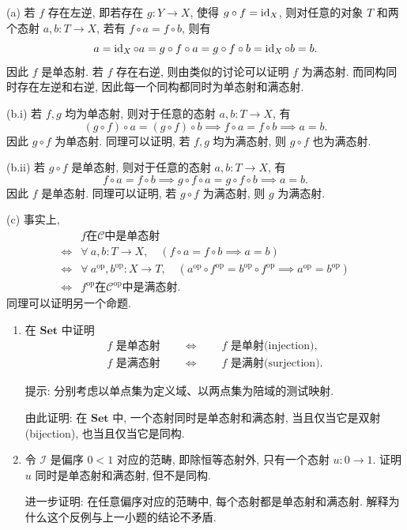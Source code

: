 \documentclass{article}
\newcommand{\op}{^{\mathrm{op}}}
\begin{document}
\begin{solution}
	(a) 若 $f$ 存在左逆, 即若存在 $g: Y \to X$, 使得 $g\circ f = \operatorname{id}_X$, 则对任意的对象 $T$ 和两个态射 $a,b: T\to X$, 若有 $f \circ a = f \circ b$, 则有
	\[ a = \operatorname{id}_X \circ a = g \circ f \circ a = g \circ f \circ b = \operatorname{id}_X \circ b = b. \]
	因此 $f$ 是单态射. 若 $f$ 存在右逆, 则由类似的讨论可以证明 $f$ 为满态射. 而同构同时存在左逆和右逆, 因此每一个同构都同时为单态射和满态射.

	(b.i) 若 $f,g$ 均为单态射, 则对于任意的态射 $a,b:T\to X$, 有
	\[ (g\circ f)\circ a = (g\circ f)\circ b \implies f \circ a = f\circ b \implies a=b. \]
	因此 $g\circ f$ 为单态射. 同理可以证明, 若 $f,g$ 均为满态射, 则 $g\circ f$ 也为满态射.

	(b.ii) 若 $g\circ f$ 是单态射, 则对于任意的态射 $a,b:T\to X$, 有
	\[ f \circ a = f \circ b \implies g \circ f \circ a = g \circ f \circ b \implies a = b. \]
	因此 $f$ 是单态射. 同理可以证明, 若 $g\circ f$ 为满态射, 则 $g$ 为满态射.

	(c) 事实上, 
	\[ \begin{array}{cc}
		& f \text{在} \mathcal{C} \text{中是单态射} \\
		\Longleftrightarrow & \forall\ a,b:T \to X, \quad (f \circ a = f \circ b \implies a=b) \\
		\Longleftrightarrow & \forall\ a\op, b\op: X\to T, \quad (a\op \circ f\op = b\op \circ f\op \implies a\op = b\op) \\
		\Longleftrightarrow & f\op \text{在} \mathcal{C}\op \text{中是满态射}.
	\end{array} \]
	同理可以证明另一个命题.
\end{solution}



\begin{problem}
  \begin{enumerate}
    \item[(a)] 在 $\mathbf{Set}$ 中证明
			\begin{gather*}
        f\text{ 是单态射}\qquad\Longleftrightarrow\qquad f\text{ 是单射(injection)},\\
        f\text{ 是满态射}\qquad\Longleftrightarrow\qquad f\text{ 是满射(surjection)}.
			\end{gather*}

      提示: 分别考虑以单点集为定义域、以两点集为陪域的测试映射.

      由此证明: 在 $\mathbf{Set}$ 中, 一个态射同时是单态射和满态射, 当且仅当它是双射(bijection), 也当且仅当它是同构.

    \item[(b)] 令 $\mathcal I$ 是偏序 $0<1$ 对应的范畴, 即除恒等态射外, 只有一个态射 $u:0\to1$. 证明 $u$ 同时是单态射和满态射, 但不是同构.

      进一步证明: 在任意偏序对应的范畴中, 每个态射都是单态射和满态射. 解释为什么这个反例与上一小题的结论不矛盾.
  \end{enumerate}
\end{problem}
\end{document}
